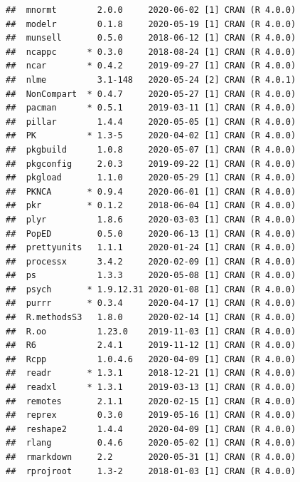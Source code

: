 \documentclass[
  10pt,
]{krantz}
\begin{document}
\begin{verbatim}
##  mnormt        2.0.0     2020-06-02 [1] CRAN (R 4.0.0)                   
##  modelr        0.1.8     2020-05-19 [1] CRAN (R 4.0.0)                   
##  munsell       0.5.0     2018-06-12 [1] CRAN (R 4.0.0)                   
##  ncappc      * 0.3.0     2018-08-24 [1] CRAN (R 4.0.0)                   
##  ncar        * 0.4.2     2019-09-27 [1] CRAN (R 4.0.0)                   
##  nlme          3.1-148   2020-05-24 [2] CRAN (R 4.0.1)                   
##  NonCompart  * 0.4.7     2020-05-27 [1] CRAN (R 4.0.0)                   
##  pacman      * 0.5.1     2019-03-11 [1] CRAN (R 4.0.0)                   
##  pillar        1.4.4     2020-05-05 [1] CRAN (R 4.0.0)                   
##  PK          * 1.3-5     2020-04-02 [1] CRAN (R 4.0.0)                   
##  pkgbuild      1.0.8     2020-05-07 [1] CRAN (R 4.0.0)                   
##  pkgconfig     2.0.3     2019-09-22 [1] CRAN (R 4.0.0)                   
##  pkgload       1.1.0     2020-05-29 [1] CRAN (R 4.0.0)                   
##  PKNCA       * 0.9.4     2020-06-01 [1] CRAN (R 4.0.0)                   
##  pkr         * 0.1.2     2018-06-04 [1] CRAN (R 4.0.0)                   
##  plyr          1.8.6     2020-03-03 [1] CRAN (R 4.0.0)                   
##  PopED         0.5.0     2020-06-13 [1] CRAN (R 4.0.0)                   
##  prettyunits   1.1.1     2020-01-24 [1] CRAN (R 4.0.0)                   
##  processx      3.4.2     2020-02-09 [1] CRAN (R 4.0.0)                   
##  ps            1.3.3     2020-05-08 [1] CRAN (R 4.0.0)                   
##  psych       * 1.9.12.31 2020-01-08 [1] CRAN (R 4.0.0)                   
##  purrr       * 0.3.4     2020-04-17 [1] CRAN (R 4.0.0)                   
##  R.methodsS3   1.8.0     2020-02-14 [1] CRAN (R 4.0.0)                   
##  R.oo          1.23.0    2019-11-03 [1] CRAN (R 4.0.0)                   
##  R6            2.4.1     2019-11-12 [1] CRAN (R 4.0.0)                   
##  Rcpp          1.0.4.6   2020-04-09 [1] CRAN (R 4.0.0)                   
##  readr       * 1.3.1     2018-12-21 [1] CRAN (R 4.0.0)                   
##  readxl      * 1.3.1     2019-03-13 [1] CRAN (R 4.0.0)                   
##  remotes       2.1.1     2020-02-15 [1] CRAN (R 4.0.0)                   
##  reprex        0.3.0     2019-05-16 [1] CRAN (R 4.0.0)                   
##  reshape2      1.4.4     2020-04-09 [1] CRAN (R 4.0.0)                   
##  rlang         0.4.6     2020-05-02 [1] CRAN (R 4.0.0)                   
##  rmarkdown     2.2       2020-05-31 [1] CRAN (R 4.0.0)                   
##  rprojroot     1.3-2     2018-01-03 [1] CRAN (R 4.0.0)                   

\end{verbatim}
\end{document}
